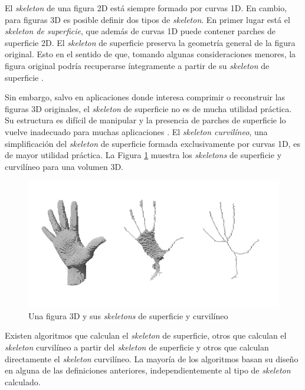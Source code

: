 El \textit{skeleton} de una figura 2D está siempre formado por curvas 1D. En cambio, para figuras 3D es posible definir dos tipos de \textit{skeleton}. En primer lugar está el \textit{skeleton de superficie}, que además de curvas 1D puede contener parches de superficie 2D. El \textit{skeleton} de superficie preserva la geometría general de la figura original. Esto en el sentido de que, tomando algunas consideraciones menores, la figura original podría recuperarse íntegramente a partir de su \textit{skeleton} de superficie \cite{borgefors1999computing}.

Sin embargo, salvo en aplicaciones donde interesa comprimir o reconstruir las figuras 3D originales, el \textit{skeleton} de superficie no es de mucha utilidad práctica. Su estructura es difícil de manipular y la presencia de parches de superficie lo vuelve inadecuado para muchas aplicaciones \cite{huang2013l1}. El \textit{skeleton curvilíneo}, una simplificación  del \textit{skeleton} de superficie formada exclusivamente por curvas 1D, es de mayor utilidad práctica. La Figura \ref{fig:surface_skel} muestra los \textit{skeletons} de superficie y curvilíneo para una volumen 3D.

\begin{figure}[H]\centering
\includegraphics[width=1.0\linewidth]{images/surface_skel}
\caption{Una figura 3D y sus \textit{skeletons} de superficie y curvilíneo}
\label{fig:surface_skel}
\end{figure}

Existen algoritmos que calculan el \textit{skeleton} de superficie, otros que calculan el \textit{skeleton} curvilíneo a partir del \textit{skeleton} de superficie y otros que calculan directamente el \textit{skeleton} curvilíneo. La mayoría de los algoritmos basan su diseño en alguna de las definiciones anteriores, independientemente al tipo de \textit{skeleton} calculado.

